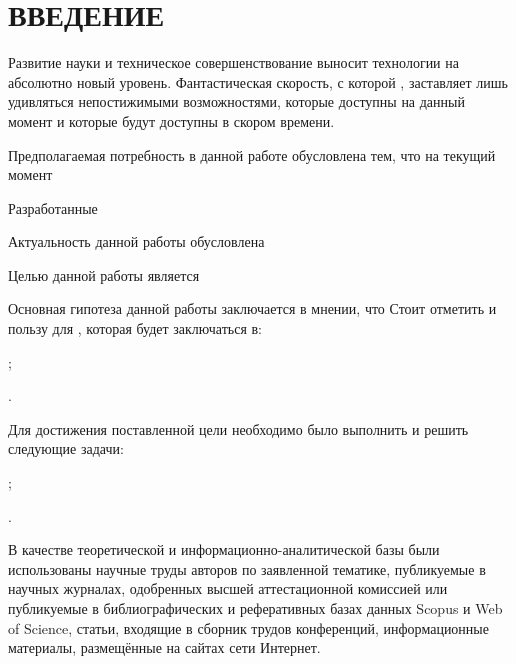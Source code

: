 \chapter*{\centering ВВЕДЕНИЕ}

Развитие науки и техническое совершенствование выносит технологии  на абсолютно новый уровень.
Фантастическая скорость, с которой , заставляет лишь удивляться непостижимыми возможностями,
которые доступны на данный момент и которые будут доступны в скором времени.

Предполагаемая потребность в данной работе обусловлена тем, что на текущий момент

Разработанные 

Актуальность данной работы обусловлена 

Целью данной работы является

Основная гипотеза данной работы заключается в мнении, что
Стоит отметить и пользу для , которая будет заключаться в:
\begin{itemizePaper}
    \item {};
    \item {}.
\end{itemizePaper}

Для достижения поставленной цели необходимо было
выполнить  и
решить следующие задачи:
\begin{itemizePaper}
    \item {};
    \item {}.
\end{itemizePaper}

В качестве теоретической и информационно-аналитической базы были использованы научные
труды авторов по заявленной тематике,
публикуемые в научных журналах,
одобренных высшей аттестационной комиссией или публикуемые в библиографических и реферативных базах данных Scopus и Web of Science,
статьи,
входящие в сборник трудов конференций, информационные материалы,
размещённые на сайтах сети Интернет.
